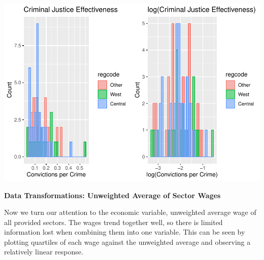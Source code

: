 \documentclass[]{article}
\begin{document}
\includegraphics{Bagnard_Gaustad_Hartman_Leung_Lab_3_files/figure-latex/unnamed-chunk-56-1.pdf}

\textbf{Data Transformations: Unweighted Average of Sector Wages}

Now we turn our attention to the economic variable, unweighted average
wage of all provided sectors. The wages trend together well, so there is
limited information lost when combining them into one variable. This can
be seen by plotting quartiles of each wage against the unweighted
average and observing a relatively linear response.
\end{document}
